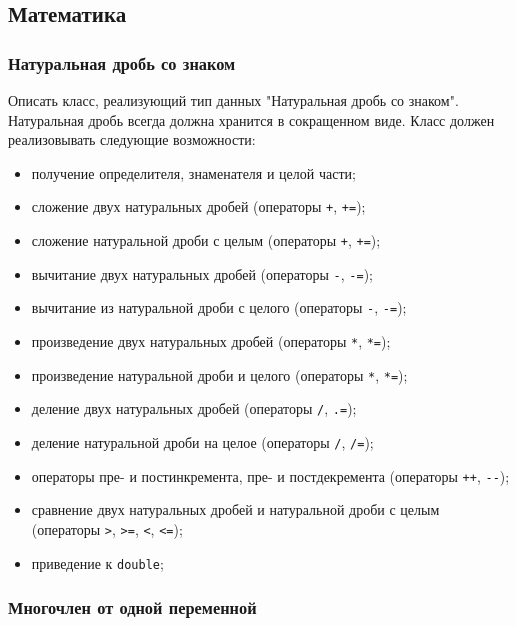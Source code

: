 \documentclass[a4paper,12pt]{article}
\begin{document}
\subsection{Математика}

\subsubsection{Натуральная дробь со знаком}

Описать класс, реализующий тип данных "Натуральная дробь со
знаком". Натуральная дробь всегда должна хранится в сокращенном виде.
Класс должен реализовывать следующие возможности:

\begin{itemize}
\item получение определителя, знаменателя и целой части;
\item сложение двух натуральных дробей (операторы \lstinline|+|,
  \lstinline|+=|);
\item сложение натуральной дроби с целым (операторы \lstinline|+|,
  \lstinline|+=|);
\item вычитание двух натуральных дробей (операторы \lstinline|-|,
  \lstinline|-=|);
\item вычитание из натуральной дроби с целого (операторы \lstinline|-|,
  \lstinline|-=|);
\item произведение двух натуральных дробей (операторы \lstinline|*|,
  \lstinline|*=|);
\item произведение натуральной дроби и целого (операторы \lstinline|*|,
  \lstinline|*=|);
\item деление двух натуральных дробей (операторы \lstinline|/|,
  \lstinline|.=|);
\item деление натуральной дроби на целое (операторы \lstinline|/|,
  \lstinline|/=|);
\item операторы пре- и постинкремента, пре- и постдекремента
  (операторы \lstinline|++|, \lstinline|--|);
\item сравнение двух натуральных дробей и натуральной дроби с целым
  (операторы \lstinline|>|, \lstinline|>=|, \lstinline|<|,
  \lstinline|<=|);
\item приведение к \lstinline|double|;
\end{itemize}

\subsubsection{Многочлен от одной переменной}
\end{document}
